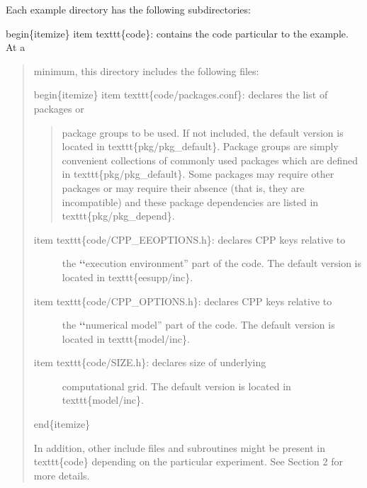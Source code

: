 \documentclass[letterpaper,10pt,english]{sphinxmanual}
\begin{document}
Each example directory has the following subdirectories:

begin\{itemize\}
item texttt\{code\}: contains the code particular to the example. At a
\begin{quote}

minimum, this directory includes the following files:

begin\{itemize\}
item texttt\{code/packages.conf\}: declares the list of packages or
\begin{quote}

package groups to be used.  If not included, the default version
is located in texttt\{pkg/pkg\_default\}.  Package groups are
simply convenient collections of commonly used packages which are
defined in texttt\{pkg/pkg\_default\}.  Some packages may require
other packages or may require their absence (that is, they are
incompatible) and these package dependencies are listed in
texttt\{pkg/pkg\_depend\}.
\end{quote}
\begin{description}
\item[{item texttt\{code/CPP\_EEOPTIONS.h\}: declares CPP keys relative to}] \leavevmode
the {\color{red}\bfseries{}{}`{}`}execution environment'' part of the code. The default
version is located in texttt\{eesupp/inc\}.

\item[{item texttt\{code/CPP\_OPTIONS.h\}: declares CPP keys relative to}] \leavevmode
the {\color{red}\bfseries{}{}`{}`}numerical model'' part of the code. The default version is
located in texttt\{model/inc\}.

\item[{item texttt\{code/SIZE.h\}: declares size of underlying}] \leavevmode
computational grid.  The default version is located in
texttt\{model/inc\}.

\end{description}

end\{itemize\}

In addition, other include files and subroutines might be present in
texttt\{code\} depending on the particular experiment. See Section 2
for more details.
\end{quote}
\end{document}
